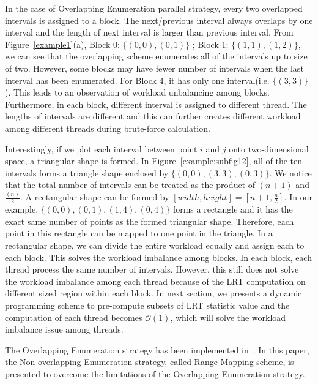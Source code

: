 \documentclass[10pt,journal,cspaper,compsoc]{IEEEtran}
\newcommand\bigo{\mathcal O}
\begin{document}
  In the case of Overlapping Enumeration parallel strategy, every two overlapped intervals is assigned to a block. The next/previous interval always overlaps by one interval and the length of next interval is larger than previous interval.  From Figure~\ref{example1}(a), Block 0: $\{(0,0),(0,1)\}$ ; Block 1: $\{(1,1),(1,2)\}$, we can see that the overlapping scheme enumerates all of the intervals up to size of two. However, some blocks may have fewer number of intervals when the last interval has been enumerated. For Block 4, it has only one interval(i.e. $\{(3,3)\}$). This leads to an observation of workload unbalancing among blocks. Furthermore, in each block, different interval is assigned to different thread. The lengths of intervals are different and this can further creates different workload among different threads during brute-force calculation.

Interestingly, if we plot each interval between point $i$ and $j$ onto two-dimensional space, a triangular shape is formed. In Figure~\ref{example:subfig12}, all of the ten intervals forms a triangle shape enclosed by $\{(0,0),(3,3),(0,3)\}$. We notice that the total number of intervals can be treated as the product of $(n+1)$ and ${\frac{(n)}{2}}$. A rectangular shape can be formed by $[width,height]=[n+1,{\frac{n}{2}}]$. In our example, $\{(0,0),(0,1),(1,4),(0,4)\}$ forms a rectangle and it has the exact same number of points as the formed triangular shape. Therefore, each point in this rectangle can be mapped to one point in the triangle. In a rectangular shape, we can divide the entire workload equally and assign each to each block. This solves the workload imbalance among blocks. In each block, each thread process the same number of intervals. However, this still does not solve the workload imbalance among each thread because of the LRT computation on different sized region within each block. In next 
section, we presents a dynamic programming scheme to pre-compute subsets of LRT statistic value and the computation of each thread becomes $\bigo(1)$, which will solve the workload imbalance issue among threads.


The Overlapping Enumeration strategy has been implemented in~\cite{apweb}. In this paper, the Non-overlapping Enumeration strategy, called Range Mapping scheme, is presented to overcome the limitations of the Overlapping Enumeration strategy.
\end{document}
